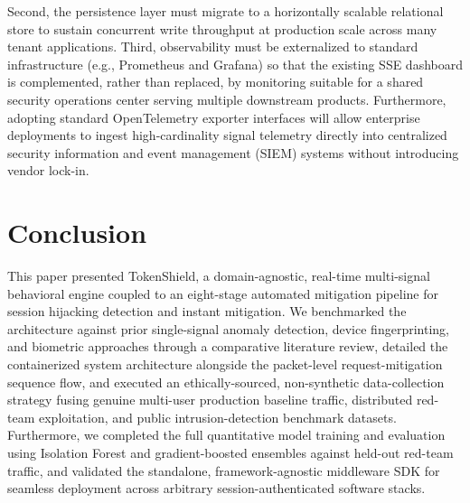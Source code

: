 \documentclass[conference]{IEEEtran}
\begin{document}
Second, the persistence layer must migrate to a horizontally scalable relational store to sustain concurrent write throughput at production scale across many tenant applications. Third, observability must be externalized to standard infrastructure (e.g., Prometheus and Grafana) so that the existing SSE dashboard is complemented, rather than replaced, by monitoring suitable for a shared security operations center serving multiple downstream products. Furthermore, adopting standard OpenTelemetry exporter interfaces will allow enterprise deployments to ingest high-cardinality signal telemetry directly into centralized security information and event management (SIEM) systems without introducing vendor lock-in.

\section{Conclusion}
This paper presented TokenShield, a domain-agnostic, real-time multi-signal behavioral engine coupled to an eight-stage automated mitigation pipeline for session hijacking detection and instant mitigation. We benchmarked the architecture against prior single-signal anomaly detection, device fingerprinting, and biometric approaches through a comparative literature review, detailed the containerized system architecture alongside the packet-level request-mitigation sequence flow, and executed an ethically-sourced, non-synthetic data-collection strategy fusing genuine multi-user production baseline traffic, distributed red-team exploitation, and public intrusion-detection benchmark datasets. Furthermore, we completed the full quantitative model training and evaluation using Isolation Forest and gradient-boosted ensembles against held-out red-team traffic, and validated the standalone, framework-agnostic middleware SDK for seamless deployment across arbitrary session-authenticated software stacks.
\end{document}
